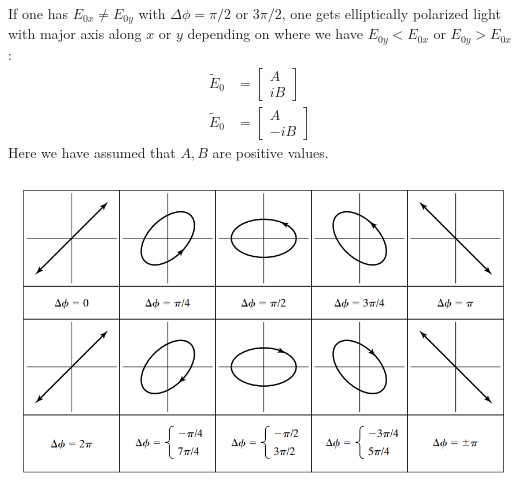 \documentclass[11pt]{book}
\theoremstyle{break}
\theoremstyle{break}
\newcommand{\that}[1]{\widetilde{#1}}
\newcommand{\bmat}[1]{\begin{bmatrix} #1 \end{bmatrix}}
\begin{document}
If one has $E_{0x} \neq E_{0y}$ with $\Delta \phi = \pi/2$ or $3\pi/2$, one gets elliptically polarized light with major axis along $x$ or $y$ depending on where we have $E_{0y}< E_{0x}$ or $E_{0y}> E_{0x}$:
\begin{align*}
\that{E}_0 &= \bmat{A \\ iB} \tag{counterclockwise rotation}\\
\that{E}_0 &= \bmat{A \\ -iB} \tag{clockwise rotation}
\end{align*} 
Here we have assumed that $A,B$ are positive values. 
\begin{center}
\includegraphics[scale=0.69]{polarziedAngle}
\end{center}
\end{document}
